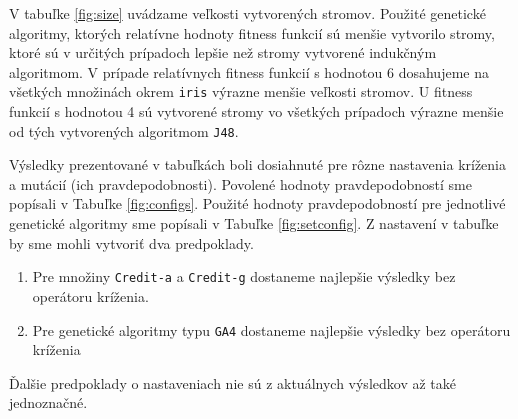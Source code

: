 V tabuľke \ref{fig:size} uvádzame veľkosti vytvorených stromov. Použité genetické algoritmy, ktorých relatívne hodnoty fitness funkcií sú menšie vytvorilo stromy, ktoré sú v určitých prípadoch lepšie než stromy vytvorené indukčným algoritmom. V prípade relatívnych fitness funkcií s hodnotou 6 dosahujeme na všetkých množinách okrem \verb|iris| výrazne menšie veľkosti stromov. U fitness funkcií s hodnotou 4 sú vytvorené stromy vo všetkých prípadoch výrazne menšie od tých vytvorených algoritmom \verb|J48|. 

Výsledky prezentované v tabuľkách boli dosiahnuté pre rôzne nastavenia kríženia a mutácií (ich pravdepodobnosti). Povolené hodnoty pravdepodobností sme popísali v Tabuľke \ref{fig:configs}. Použité hodnoty pravdepodobností pre jednotlivé genetické algoritmy sme popísali v Tabuľke \ref{fig:setconfig}. Z nastavení v tabuľke by sme mohli vytvoriť dva predpoklady.
\begin{enumerate}
\item Pre množiny \verb|Credit-a| a \verb|Credit-g| dostaneme najlepšie výsledky bez operátoru kríženia.
\item Pre genetické algoritmy typu \verb|GA4| dostaneme najlepšie výsledky bez operátoru kríženia
\end{enumerate}
Ďalšie predpoklady o nastaveniach nie sú z aktuálnych výsledkov až také jednoznačné.


